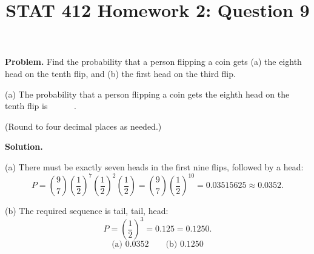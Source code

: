 \documentclass[11pt]{article}
\title{STAT 412 Homework 2: Question 9}
\author{}
\date{}
\begin{document}
\maketitle
\textbf{Problem.} Find the probability that a person flipping a coin gets (a)
the eighth head on the tenth flip, and (b) the first head on the third flip.

(a) The probability that a person flipping a coin gets the eighth head on the
tenth flip is \(\boxed{\phantom{0.0000}}\).

(Round to four decimal places as needed.)

\textbf{Solution.}

(a) There must be exactly seven heads in the first nine flips, followed by a head:
\[
P=\binom97\left(\frac12\right)^7\left(\frac12\right)^2
\left(\frac12\right)=\binom97\left(\frac12\right)^{10}
=0.03515625\approx0.0352.
\]

(b) The required sequence is tail, tail, head:
\[
P=\left(\frac12\right)^3=0.125=0.1250.
\]
\[
\boxed{\text{(a) }0.0352\qquad\text{(b) }0.1250}
\]
\end{document}
